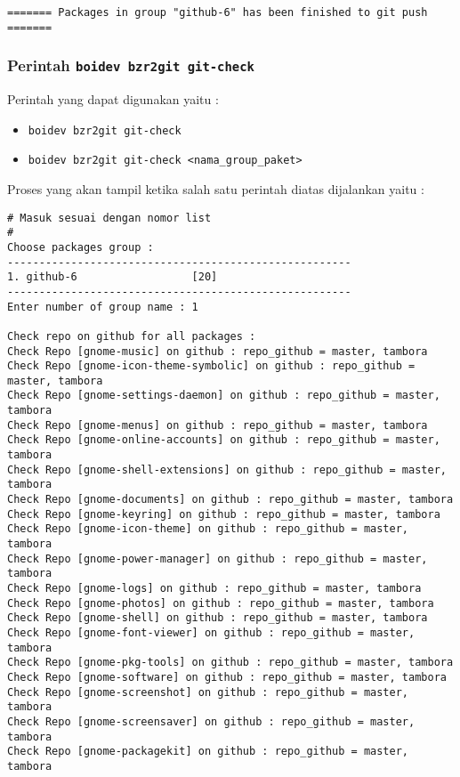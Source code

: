 {\begin{lstlisting}[language=ShellBash2]
======= Packages in group "github-6" has been finished to git push =======
\end{lstlisting}

\subsubsection{Perintah {\small \texttt{boidev bzr2git git-check}}}
\noindent
Perintah yang dapat digunakan yaitu :
\begin{itemize}
	\item {\small \texttt{boidev bzr2git git-check}}
	\item {\small \texttt{boidev bzr2git git-check <nama\_group\_paket>}}
\end{itemize}

\noindent
Proses yang akan tampil ketika salah satu perintah diatas dijalankan yaitu :

\begin{lstlisting}[language=ShellBash2]
# Masuk sesuai dengan nomor list
#
Choose packages group : 
------------------------------------------------------
1. github-6                  [20]
------------------------------------------------------
Enter number of group name : 1

Check repo on github for all packages : 
Check Repo [gnome-music] on github : repo_github = master, tambora 
Check Repo [gnome-icon-theme-symbolic] on github : repo_github = master, tambora 
Check Repo [gnome-settings-daemon] on github : repo_github = master, tambora 
Check Repo [gnome-menus] on github : repo_github = master, tambora 
Check Repo [gnome-online-accounts] on github : repo_github = master, tambora 
Check Repo [gnome-shell-extensions] on github : repo_github = master, tambora 
Check Repo [gnome-documents] on github : repo_github = master, tambora 
Check Repo [gnome-keyring] on github : repo_github = master, tambora 
Check Repo [gnome-icon-theme] on github : repo_github = master, tambora 
Check Repo [gnome-power-manager] on github : repo_github = master, tambora 
Check Repo [gnome-logs] on github : repo_github = master, tambora 
Check Repo [gnome-photos] on github : repo_github = master, tambora 
Check Repo [gnome-shell] on github : repo_github = master, tambora 
Check Repo [gnome-font-viewer] on github : repo_github = master, tambora 
Check Repo [gnome-pkg-tools] on github : repo_github = master, tambora 
Check Repo [gnome-software] on github : repo_github = master, tambora 
Check Repo [gnome-screenshot] on github : repo_github = master, tambora 
Check Repo [gnome-screensaver] on github : repo_github = master, tambora 
Check Repo [gnome-packagekit] on github : repo_github = master, tambora 


\end{lstlisting}}
